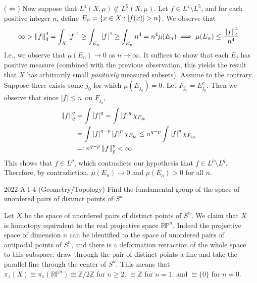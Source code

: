 \documentclass{article}
\begin{document}
\begin{solutions}
	($\Leftarrow$) Now suppose that $L^{4}(X, \mu) \not\subset L^{5}(X, \mu)$. Let $f \in L^{4}\setminus L^{5}$, and for each positive integer $n$, define $E_{n} = \brac*{x \in X: \abs{f(x)} > n}$. We observe that 
		\begin{equation}
			\infty > \norm{f}_{4}^{4} = \int_{X}\abs{f}^{4} \geq \int_{E_{n}}\abs{f}^{4} \geq \int_{E_{n}}n^{4} = n^{4}\mu(E_{n}) \implies \mu(E_{n}) \leq \frac{\norm{f}_{4}^{4}}{n^{4}}
		\end{equation}
	I.e., we observe that $\mu(E_{n}) \to 0$ as $n \to \infty$. It suffices to show that each $E_{j}$ has positive measure (combined with the previous observation, this yields the result that $X$ has arbitrarily small \textit{positively} measured subsets). Assume to the contrary. Suppose there exists some $j_{0}$ for which $\mu(E_{j_{0}}) = 0$. Let $F_{j_{0}} = E_{j_{0}}^{c}$. Then we observe that since $\abs{f} \leq n$ on $F_{j_{0}}$, 
	\begin{align}
		\begin{split}
			\norm{f}_{q}^{q} &= \int \abs{f}^{q} = \int \abs{f}^{q}\chi_{F_{j_{0}}} \\
			&= \int \abs{f}^{q- p}\abs{f}^{p}\chi_{F_{j_{0}}} \leq n^{q - p}\int \abs{f}^{p}\chi_{F_{j_0}} \\
			&\eqqcolon n^{q - p}\norm{f}_{p}^{p} < \infty. 
		\end{split}
	\end{align}
	This shows that $f \in L^{p}$, which contradicts our hypothesis that $f \in L^{p}\setminus L^{q}$. Therefore, by contradiction, $\mu(E_{n}) \to 0$ and $\mu(E_{n}) > 0$ for all $n$. 
\end{solutions}


\begin{prb}{2022-A-I-4 (Geometry/Topology)}
	Find the fundamental group of the space of unordered pairs of distinct points of $S^{n}$. 
\end{prb}
\begin{solutions}
	Let $X$ be the space of unordered pairs of distinct points of $S^{n}$. We claim that $X$ is homotopy equivalent to the real projective space $\mathbb{RP}^{n}$. Indeed the projective space of dimension $n$ can be identified to the space of unordered pairs of antipodal points of $S^{n}$, and there is a deformation retraction of the whole space to this subspace: draw through the pair of distinct points a line and take the parallel line through the center of $S^{n}$. This means that $\pi_{1}(X) \cong \pi_{1}(\mathbb{RP}^{n}) \cong \mathbb{Z}/2\mathbb{Z}$ for $n\geq 2$, $\cong \mathbb{Z}$ for $n = 1$, and $\cong \{0\}$ for $n =0$. 
\end{solutions}
\end{document}
